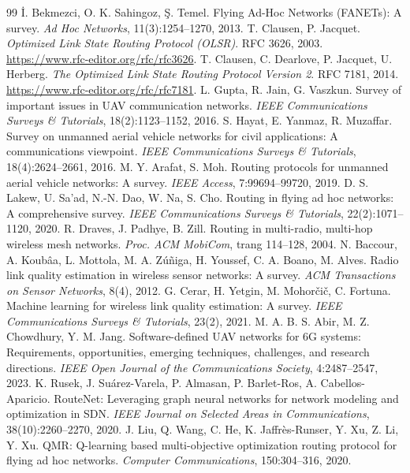 \documentclass[12pt,a4paper]{report}
\begin{document}
\clearpage
{}
{}
\begin{thebibliography}{99}
 İ. Bekmezci, O. K. Sahingoz, Ş. Temel. Flying Ad-Hoc Networks (FANETs): A survey. \textit{Ad Hoc Networks}, 11(3):1254--1270, 2013.
 T. Clausen, P. Jacquet. \textit{Optimized Link State Routing Protocol (OLSR)}. RFC 3626, 2003. \url{https://www.rfc-editor.org/rfc/rfc3626}.
 T. Clausen, C. Dearlove, P. Jacquet, U. Herberg. \textit{The Optimized Link State Routing Protocol Version 2}. RFC 7181, 2014. \url{https://www.rfc-editor.org/rfc/rfc7181}.
 L. Gupta, R. Jain, G. Vaszkun. Survey of important issues in UAV communication networks. \textit{IEEE Communications Surveys \& Tutorials}, 18(2):1123--1152, 2016.
 S. Hayat, E. Yanmaz, R. Muzaffar. Survey on unmanned aerial vehicle networks for civil applications: A communications viewpoint. \textit{IEEE Communications Surveys \& Tutorials}, 18(4):2624--2661, 2016.
 M. Y. Arafat, S. Moh. Routing protocols for unmanned aerial vehicle networks: A survey. \textit{IEEE Access}, 7:99694--99720, 2019.
 D. S. Lakew, U. Sa'ad, N.-N. Dao, W. Na, S. Cho. Routing in flying ad hoc networks: A comprehensive survey. \textit{IEEE Communications Surveys \& Tutorials}, 22(2):1071--1120, 2020.
 R. Draves, J. Padhye, B. Zill. Routing in multi-radio, multi-hop wireless mesh networks. \textit{Proc. ACM MobiCom}, trang 114--128, 2004.
 N. Baccour, A. Koubâa, L. Mottola, M. A. Zúñiga, H. Youssef, C. A. Boano, M. Alves. Radio link quality estimation in wireless sensor networks: A survey. \textit{ACM Transactions on Sensor Networks}, 8(4), 2012.
 G. Cerar, H. Yetgin, M. Mohorčič, C. Fortuna. Machine learning for wireless link quality estimation: A survey. \textit{IEEE Communications Surveys \& Tutorials}, 23(2), 2021.
 M. A. B. S. Abir, M. Z. Chowdhury, Y. M. Jang. Software-defined UAV networks for 6G systems: Requirements, opportunities, emerging techniques, challenges, and research directions. \textit{IEEE Open Journal of the Communications Society}, 4:2487--2547, 2023.
 K. Rusek, J. Suárez-Varela, P. Almasan, P. Barlet-Ros, A. Cabellos-Aparicio. RouteNet: Leveraging graph neural networks for network modeling and optimization in SDN. \textit{IEEE Journal on Selected Areas in Communications}, 38(10):2260--2270, 2020.
 J. Liu, Q. Wang, C. He, K. Jaffrès-Runser, Y. Xu, Z. Li, Y. Xu. QMR: Q-learning based multi-objective optimization routing protocol for flying ad hoc networks. \textit{Computer Communications}, 150:304--316, 2020.

\end{thebibliography}
\end{document}
